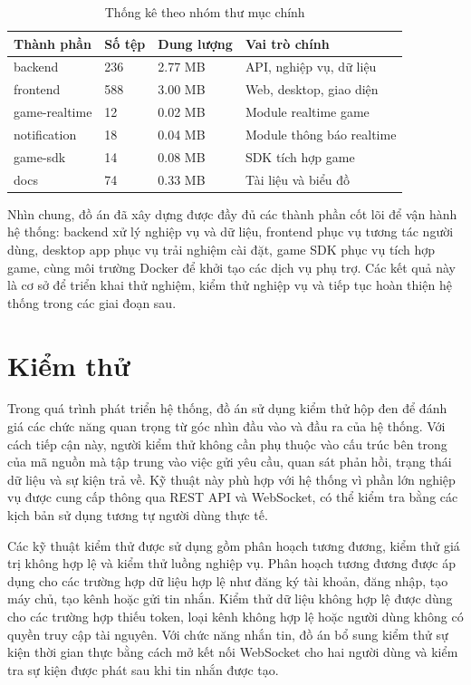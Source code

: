\begin{table}[H]
    \centering
    \caption{Thống kê theo nhóm thư mục chính}
    \label{tab:4-9-thong-ke-thu-muc}
    \begin{tabular}{|p{}|p{}|p{}|p{}|}
        \hline
        \textbf{Thành phần} & \textbf{Số tệp} & \textbf{Dung lượng} & \textbf{Vai trò chính} \\ \hline
        backend & 236 & 2.77 MB & API, nghiệp vụ, dữ liệu \\ \hline
        frontend & 588 & 3.00 MB & Web, desktop, giao diện \\ \hline
        game-realtime & 12 & 0.02 MB & Module realtime game \\ \hline
        notification & 18 & 0.04 MB & Module thông báo realtime \\ \hline
        game-sdk & 14 & 0.08 MB & SDK tích hợp game \\ \hline
        docs & 74 & 0.33 MB & Tài liệu và biểu đồ \\ \hline
    \end{tabular}
\end{table}

Nhìn chung, đồ án đã xây dựng được đầy đủ các thành phần cốt lõi để vận hành hệ thống: backend xử lý nghiệp vụ và dữ liệu, frontend phục vụ tương tác người dùng, desktop app phục vụ trải nghiệm cài đặt, game SDK phục vụ tích hợp game, cùng môi trường Docker để khởi tạo các dịch vụ phụ trợ. Các kết quả này là cơ sở để triển khai thử nghiệm, kiểm thử nghiệp vụ và tiếp tục hoàn thiện hệ thống trong các giai đoạn sau.

\section{Kiểm thử}
\label{section:4.4}

Trong quá trình phát triển hệ thống, đồ án sử dụng kiểm thử hộp đen để đánh giá các chức năng quan trọng từ góc nhìn đầu vào và đầu ra của hệ thống. Với cách tiếp cận này, người kiểm thử không cần phụ thuộc vào cấu trúc bên trong của mã nguồn mà tập trung vào việc gửi yêu cầu, quan sát phản hồi, trạng thái dữ liệu và sự kiện trả về. Kỹ thuật này phù hợp với hệ thống vì phần lớn nghiệp vụ được cung cấp thông qua REST API và WebSocket, có thể kiểm tra bằng các kịch bản sử dụng tương tự người dùng thực tế.

Các kỹ thuật kiểm thử được sử dụng gồm phân hoạch tương đương, kiểm thử giá trị không hợp lệ và kiểm thử luồng nghiệp vụ. Phân hoạch tương đương được áp dụng cho các trường hợp dữ liệu hợp lệ như đăng ký tài khoản, đăng nhập, tạo máy chủ, tạo kênh hoặc gửi tin nhắn. Kiểm thử dữ liệu không hợp lệ được dùng cho các trường hợp thiếu token, loại kênh không hợp lệ hoặc người dùng không có quyền truy cập tài nguyên. Với chức năng nhắn tin, đồ án bổ sung kiểm thử sự kiện thời gian thực bằng cách mở kết nối WebSocket cho hai người dùng và kiểm tra sự kiện được phát sau khi tin nhắn được tạo.

